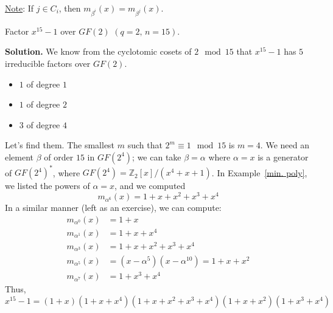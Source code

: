 \underline{Note}: If $ j\in C_i $, then $ m_{\beta^i}(x)=m_{\beta^j}(x) $.

\begin{exbox}
    \begin{example}
        Factor $ x^{15}-1 $ over $ GF(2) $ $ (q=2,\,n=15) $.

        \textbf{Solution.} We know from the cyclotomic cosets
        of $ 2\mod 15 $ that $ x^{15}-1 $ has $ 5 $ irreducible
        factors over $ GF(2) $.
        \begin{itemize}
            \item $ 1 $ of degree $ 1 $
            \item $ 1 $ of degree $ 2 $
            \item $ 3 $ of degree $ 4 $
        \end{itemize}
        Let's find them. The smallest $ m $ such that
        $ 2^m\equiv 1\mod 15 $ is $ m=4 $. We need an element
        $ \beta $ of order $ 15 $ in $ GF(2^4) $; we can
        take $ \beta=\alpha $ where $ \alpha=x $
        is a generator of $ GF(2^4)^* $, where
        $ GF(2^4)=\mathbb{Z}_2[x]/(x^4+x+1) $. In Example~\ref{min. poly},
        we listed the powers of $ \alpha=x $, and we computed
        \[ m_{\alpha^6}(x)=1+x+x^2+x^3+x^4 \]
        In a similar manner (left as an exercise), we can compute:
        \begin{align*}
            m_{\alpha^0}(x) & =1+x                                 \\
            m_{\alpha^1}(x) & =1+x+x^4                             \\
            m_{\alpha^3}(x) & =1+x+x^2+x^3+x^4                     \\
            m_{\alpha^5}(x) & =(x-\alpha^5)(x-\alpha^{10})=1+x+x^2 \\
            m_{\alpha^7}(x) & =1+x^3+x^4
        \end{align*}
        Thus,
        \[ x^{15}-1=(1+x)(1+x+x^4)(1+x+x^2+x^3+x^4)(1+x+x^2)(1+x^3+x^4) \]
    \end{example}
\end{exbox}

